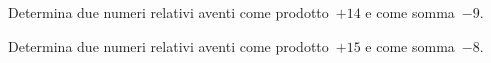 \begin{htmulticols}{2}
\begin{esercizio}
Determina due numeri relativi aventi come prodotto~\(+14\) e come 
somma~\(-9\). 
\end{esercizio}

\begin{esercizio}
Determina due numeri relativi aventi come prodotto~\(+15\) e come 
somma~\(-8\). 
\end{esercizio}

\end{htmulticols}

